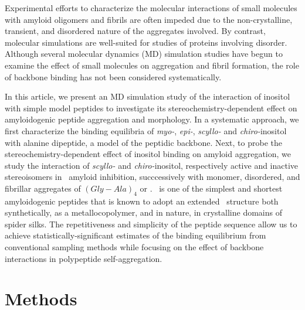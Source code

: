 Experimental efforts to characterize the molecular interactions of small molecules with amyloid oligomers and fibrils are often impeded due to the non-crystalline, transient, and disordered nature of the aggregates involved. By contrast, molecular simulations are well-suited for studies of proteins involving disorder.\cite{Rauscher:2010p88} Although several molecular dynamics (MD) simulation studies have begun to examine the effect of small molecules on aggregation and fibril formation,\cite{Takeda:2010p34,Raman:2009p47,Lemkul:2010p23,Liu:2009p18} the role of backbone binding has not been considered systematically.

In this article, we present an MD simulation study of the interaction of inositol with simple model peptides to investigate its stereochemistry-dependent effect on amyloidogenic peptide aggregation and morphology. In a systematic approach, we first characterize the binding equilibria of \textit{myo-}, \textit{epi-}, \textit{scyllo-} and \textit{chiro-}inositol with alanine dipeptide, a model of the peptidic backbone. Next, to probe the stereochemistry-dependent effect of inositol binding on amyloid aggregation, we study the interaction of \textit{scyllo-} and \textit{chiro-}inositol, respectively active and inactive stereoisomers in \abeta\ amyloid inhibition, succcessively with monomer, disordered, and fibrillar aggregates of $(Gly-Ala)_4$ or \gafour. \gafour\ is one of the simplest and shortest amyloidogenic peptides that is known to adopt an extended \bsheet\ structure both synthetically,\cite{Rathore:2001p37} as a metallocopolymer,\cite{Vandermeulen:2006p15} and in nature, in crystalline domains of spider silks.\cite{Kenney:2002p45,Fossey:1991fk} The repetitiveness and simplicity of the peptide sequence allow us to achieve statistically-significant estimates of the binding equilibrium from conventional sampling methods while focusing on the effect of backbone interactions in polypeptide self-aggregation. 

\section{Methods}

